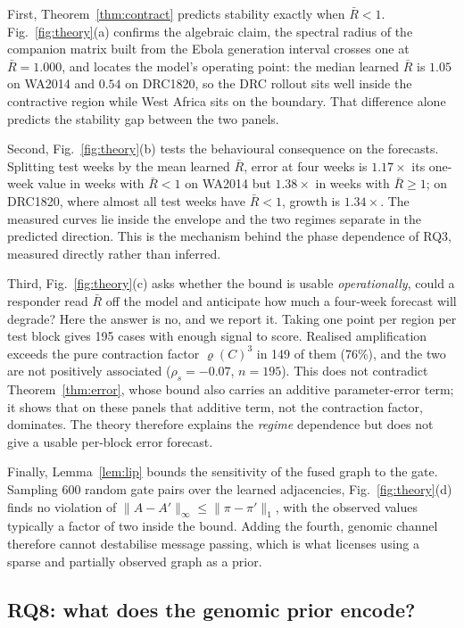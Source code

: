 \documentclass[conference]{IEEEtran}
\begin{document}
First, Theorem~\ref{thm:contract} predicts stability exactly when $\bar R<1$. Fig.~\ref{fig:theory}(a) confirms the algebraic claim, the spectral radius of the companion matrix built from the Ebola generation interval crosses one at $\bar R=1.000$, and locates the model's operating point: the median learned $\bar R$ is $1.05$ on WA2014 and $0.54$ on DRC1820, so the DRC rollout sits well inside the contractive region while West Africa sits on the boundary. That difference alone predicts the stability gap between the two panels.

Second, Fig.~\ref{fig:theory}(b) tests the behavioural consequence on the forecasts. Splitting test weeks by the mean learned $\bar R$, error at four weeks is $1.17\times$ its one-week value in weeks with $\bar R<1$ on WA2014 but $1.38\times$ in weeks with $\bar R\geq1$; on DRC1820, where almost all test weeks have $\bar R<1$, growth is $1.34\times$. The measured curves lie inside the envelope and the two regimes separate in the predicted direction. This is the mechanism behind the phase dependence of RQ3, measured directly rather than inferred.

Third, Fig.~\ref{fig:theory}(c) asks whether the bound is usable \emph{operationally}, could a responder read $\bar R$ off the model and anticipate how much a four-week forecast will degrade? Here the answer is no, and we report it. Taking one point per region per test block gives 195 cases with enough signal to score. Realised amplification exceeds the pure contraction factor $\varrho(C)^3$ in 149 of them (76\%), and the two are not positively associated ($\rho_s=-0.07$, $n=195$). This does not contradict Theorem~\ref{thm:error}, whose bound also carries an additive parameter-error term; it shows that on these panels that additive term, not the contraction factor, dominates. The theory therefore explains the \emph{regime} dependence but does not give a usable per-block error forecast.

Finally, Lemma~\ref{lem:lip} bounds the sensitivity of the fused graph to the gate. Sampling 600 random gate pairs over the learned adjacencies, Fig.~\ref{fig:theory}(d) finds no violation of $\|A-A'\|_\infty\leq\|\pi-\pi'\|_1$, with the observed values typically a factor of two inside the bound. Adding the fourth, genomic channel therefore cannot destabilise message passing, which is what licenses using a sparse and partially observed graph as a prior.

\subsection{RQ8: what does the genomic prior encode?}
\end{document}
